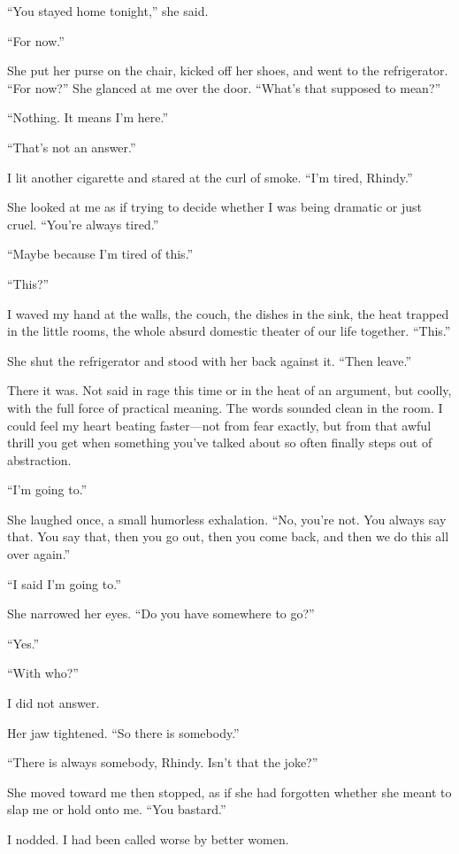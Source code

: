 ``You stayed home tonight,'' she said.

``For now.''

She put her purse on the chair, kicked off her shoes, and went to the
refrigerator. ``For now?'' She glanced at me over the door. ``What's
that supposed to mean?''

``Nothing. It means I'm here.''

``That's not an answer.''

I lit another cigarette and stared at the curl of smoke. ``I'm tired,
Rhindy.''

She looked at me as if trying to decide whether I was being dramatic or
just cruel. ``You're always tired.''

``Maybe because I'm tired of this.''

``This?''

I waved my hand at the walls, the couch, the dishes in the sink, the
heat trapped in the little rooms, the whole absurd domestic theater of
our life together. ``This.''

She shut the refrigerator and stood with her back against it. ``Then
leave.''

There it was. Not said in rage this time or in the heat of an argument,
but coolly, with the full force of practical meaning. The words sounded
clean in the room. I could feel my heart beating faster---not from fear
exactly, but from that awful thrill you get when something you've talked
about so often finally steps out of abstraction.

``I'm going to.''

She laughed once, a small humorless exhalation. ``No, you're not. You
always say that. You say that, then you go out, then you come back, and
then we do this all over again.''

``I said I'm going to.''

She narrowed her eyes. ``Do you have somewhere to go?''

``Yes.''

``With who?''

I did not answer.

Her jaw tightened. ``So there is somebody.''

``There is always somebody, Rhindy. Isn't that the joke?''

She moved toward me then stopped, as if she had forgotten whether she
meant to slap me or hold onto me. ``You bastard.''

I nodded. I had been called worse by better women.


